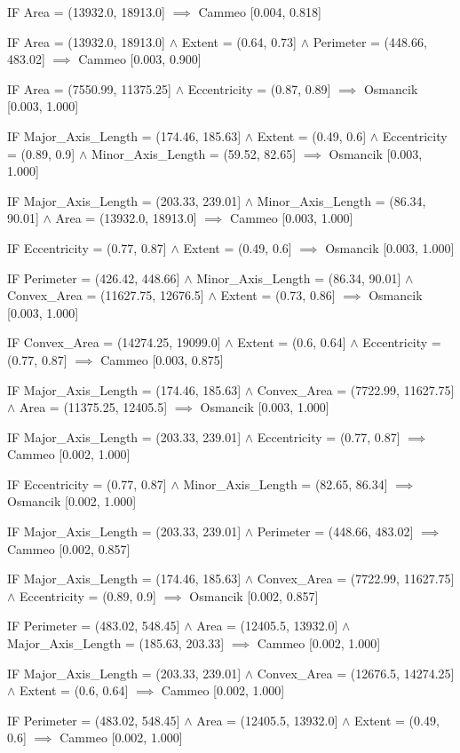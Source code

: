 IF Area = (13932.0, 18913.0] $\implies$ Cammeo [0.004, 0.818]

IF Area = (13932.0, 18913.0] $\land$ Extent = (0.64, 0.73] $\land$ Perimeter = (448.66, 483.02] $\implies$ Cammeo [0.003, 0.900]

IF Area = (7550.99, 11375.25] $\land$ Eccentricity = (0.87, 0.89] $\implies$ Osmancik [0.003, 1.000]

IF Major_Axis_Length = (174.46, 185.63] $\land$ Extent = (0.49, 0.6] $\land$ Eccentricity = (0.89, 0.9] $\land$ Minor_Axis_Length = (59.52, 82.65] $\implies$ Osmancik [0.003, 1.000]

IF Major_Axis_Length = (203.33, 239.01] $\land$ Minor_Axis_Length = (86.34, 90.01] $\land$ Area = (13932.0, 18913.0] $\implies$ Cammeo [0.003, 1.000]

IF Eccentricity = (0.77, 0.87] $\land$ Extent = (0.49, 0.6] $\implies$ Osmancik [0.003, 1.000]

IF Perimeter = (426.42, 448.66] $\land$ Minor_Axis_Length = (86.34, 90.01] $\land$ Convex_Area = (11627.75, 12676.5] $\land$ Extent = (0.73, 0.86] $\implies$ Osmancik [0.003, 1.000]

IF Convex_Area = (14274.25, 19099.0] $\land$ Extent = (0.6, 0.64] $\land$ Eccentricity = (0.77, 0.87] $\implies$ Cammeo [0.003, 0.875]

IF Major_Axis_Length = (174.46, 185.63] $\land$ Convex_Area = (7722.99, 11627.75] $\land$ Area = (11375.25, 12405.5] $\implies$ Osmancik [0.003, 1.000]

IF Major_Axis_Length = (203.33, 239.01] $\land$ Eccentricity = (0.77, 0.87] $\implies$ Cammeo [0.002, 1.000]

IF Eccentricity = (0.77, 0.87] $\land$ Minor_Axis_Length = (82.65, 86.34] $\implies$ Osmancik [0.002, 1.000]

IF Major_Axis_Length = (203.33, 239.01] $\land$ Perimeter = (448.66, 483.02] $\implies$ Cammeo [0.002, 0.857]

IF Major_Axis_Length = (174.46, 185.63] $\land$ Convex_Area = (7722.99, 11627.75] $\land$ Eccentricity = (0.89, 0.9] $\implies$ Osmancik [0.002, 0.857]

IF Perimeter = (483.02, 548.45] $\land$ Area = (12405.5, 13932.0] $\land$ Major_Axis_Length = (185.63, 203.33] $\implies$ Cammeo [0.002, 1.000]

IF Major_Axis_Length = (203.33, 239.01] $\land$ Convex_Area = (12676.5, 14274.25] $\land$ Extent = (0.6, 0.64] $\implies$ Cammeo [0.002, 1.000]

IF Perimeter = (483.02, 548.45] $\land$ Area = (12405.5, 13932.0] $\land$ Extent = (0.49, 0.6] $\implies$ Cammeo [0.002, 1.000]

